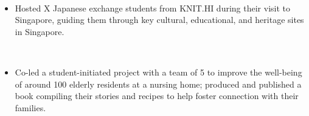 \documentclass[a4paper,10pt]{article}
\begin{document}
\begin{center}
\begin{minipage}{1\textwidth}
      \noindent
      \hfill
      \\

      \vspace{0.15cm}

      \begin{itemize}[left=0pt, labelsep=0.5em, itemsep=0pt, topsep=0pt, parsep=0pt, partopsep=0pt]
        \item \small\lato Hosted X Japanese exchange students from KNIT.HI during their visit to Singapore, guiding them through key cultural, educational, and heritage sites in Singapore.
      \end{itemize}

      \vspace{0.25cm}

      \noindent
      \hfill
      \\

      \vspace{0.15cm}

      \begin{itemize}[left=0pt, labelsep=0.5em, itemsep=0pt, topsep=0pt, parsep=0pt, partopsep=0pt]
        \item \small\lato Co-led a student-initiated project with a team of 5 to improve the well-being of around 100 elderly residents at a nursing home; produced and published a book compiling their stories and recipes to help foster connection with their families.\\
      \end{itemize}

      \normalsize\noindent{}\\[-0.25cm]
      \makebox[\linewidth]{\rule{1.02\linewidth}{0.3pt}}
      
      \normalsize{} \small{}
      \normalsize{} \small{}

    \end{minipage}
  \end{center}
\end{document}
